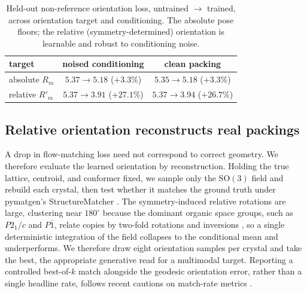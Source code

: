 \documentclass[10pt]{article}
\begin{document}
\begin{table}[t]
\centering
\caption{Held-out non-reference orientation loss, untrained $\rightarrow$
trained, across orientation target and conditioning. The absolute pose floors;
the relative (symmetry-determined) orientation is learnable and robust to
conditioning noise.}
\label{tab:twobytwo}
\begin{tabular}{lcc}
\toprule
target & noised conditioning & clean packing \\
\midrule
absolute $R_m$  & $5.37\!\rightarrow\!5.18$ ($+3.3\%$) & $5.35\!\rightarrow\!5.18$ ($+3.3\%$) \\
relative $R'_m$ & $5.37\!\rightarrow\!3.91$ ($+27.1\%$) & $5.37\!\rightarrow\!3.94$ ($+26.7\%$) \\
\bottomrule
\end{tabular}
\end{table}

\subsection{Relative orientation reconstructs real packings}

A drop in flow-matching loss need not correspond to correct geometry. We
therefore evaluate the learned orientation by reconstruction. Holding the true
lattice, centroid, and conformer fixed, we sample only the $\mathrm{SO}(3)$ field
and rebuild each crystal, then test whether it matches the ground truth under
pymatgen's StructureMatcher \citep{ong2013pymatgen}. The symmetry-induced relative
rotations are large, clustering near $180^\circ$ because the dominant organic
space groups, such as $P2_1/c$ and $P\bar{1}$, relate copies by two-fold
rotations and inversions \citep{groom2016csd}, so a single deterministic
integration of the field collapses to the conditional mean and underperforms. We
therefore draw eight orientation samples per crystal and take the best, the
appropriate generative read for a multimodal target. Reporting a
controlled best-of-$k$ match alongside the geodesic orientation error, rather
than a single headline rate, follows recent cautions on match-rate
metrics \citep{martirossyan2025matching}.
\end{document}

